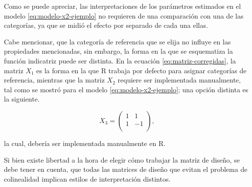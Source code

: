 \documentclass[
  11pt,
]{book}
\theoremstyle{definition}
\theoremstyle{definition}
\theoremstyle{definition}
\theoremstyle{definition}
\theoremstyle{remark}
\begin{document}
\begin{table}[H]
\centering
\caption{\label{tab:tablaxx}Ejemplificación de la relación de parámetros y esquema de función indicatriz}
\centering
{}
\end{table}

Como se puede apreciar, las interpretaciones de los parámetros estimados en el modelo \eqref{eq:modelo-x2-ejemplo} no requieren de una comparación con una de las categorías, ya que se midió el efecto por separado de cada una ellas.

Cabe mencionar, que la categoría de referencia que se elija no influye en las propiedades mencionadas, sin embargo, la forma en la que se esquematiza la función indicatriz puede ser distinta. En la ecuación \eqref{eq:matriz-corregidas}, la matriz \(X_1\) es la forma en la que R trabaja por defecto para asignar categorías de referencia, mientras que la matriz \(X_2\) requiere ser implementada manualmente, tal como se mostró para el modelo \eqref{eq:modelo-x2-ejemplo}; una opción distinta es la siguiente.

\begin{equation}
X_3 = \begin{pmatrix}
1 & 1 \\
1 & -1 \\
\end{pmatrix},
\label{eq:matriz-corregida3}
\end{equation}

la cual, debería ser implementada manualmente en R.

Si bien existe libertad a la hora de elegir cómo trabajar la matriz de diseño, se debe tener en cuenta, que todas las matrices de diseño que evitan el problema de colinealidad implican estilos de interpretación distintos.

\backmatter


\end{document}
